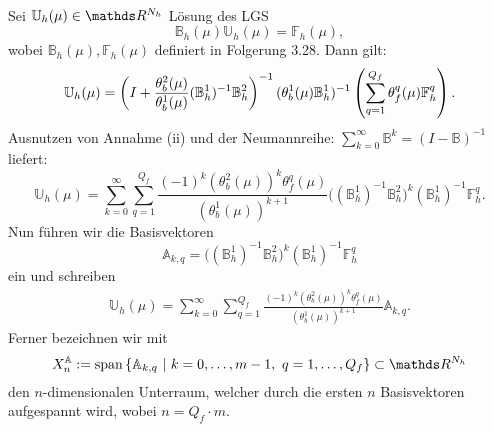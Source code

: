 \\
Sei $\mathbb{U}_h(\mu)\in \R^{N_h}$ Lösung des LGS
\[
\mathbb{B}_h(\mu) \mathbb{U}_h(\mu) = \mathbb{F}_h(\mu),
\]
wobei $\mathbb{B}_h(\mu),\mathbb{F}_h(\mu)$ definiert in Folgerung 3.28.
Dann gilt:
\[
\mathbb{U}_h(\mu) = \left( I + \frac{\theta_b^2(\mu)}{\theta_b^1(\mu)}(\mathbb{B}_h^1)^{-1}\mathbb{B}_h^2\right)^{-1} (\theta_b^1(\mu)\mathbb{B}_h^1)^{-1} \left( \sum_{q=1}^{Q_f}\theta_f^q(\mu)\mathbb{F}_h^q\right).
\]
Ausnutzen von Annahme (ii) und der Neumannreihe: $\sum_{k=0}^{\infty} \mathbb{B}^k = (I-\mathbb{B})^{-1}$ liefert:
\[
\mathbb{U}_h(\mu) = \sum_{k=0}^{\infty} \sum_{q=1}^{Q_f} \frac{(-1)^k (\theta_b^2(\mu))^k \theta_f^q(\mu)}{(\theta_b^1(\mu))^{k+1}} \bigg((\mathbb{B}_h^1)^{-1}\mathbb{B}_h^2\bigg)^k (\mathbb{B}_h^1)^{-1} \mathbb{F}_h^q.
\]
Nun führen wir die Basisvektoren
\[
\mathbb{A}_{k,q} = \bigg((\mathbb{B}_h^1)^{-1}\mathbb{B}_h^2\bigg)^k (\mathbb{B}_h^1)^{-1} \mathbb{F}_h^q
\]
ein und schreiben
\begin{align}
\mathbb{U}_h(\mu) = \sum_{k=0}^{\infty} \sum_{q=1}^{Q_f} \frac{(-1)^k (\theta_b^2(\mu))^k \theta_f^q(\mu)}{(\theta_b^1(\mu))^{k+1}} \mathbb{A}_{k,q}.
\end{align}
Ferner bezeichnen wir mit 
\[
X_n^{\mathbb{A}} := \spann \penbrace{\mathbb{A}_{k,q} ~|~k=0\dt{,}m-1,~q=1\dt{,}Q_f} \subset \R^{N_h}
\]
den $n$-dimensionalen Unterraum, welcher durch die ersten $n$ Basisvektoren aufgespannt wird, wobei $n=Q_f\cdot m$.

